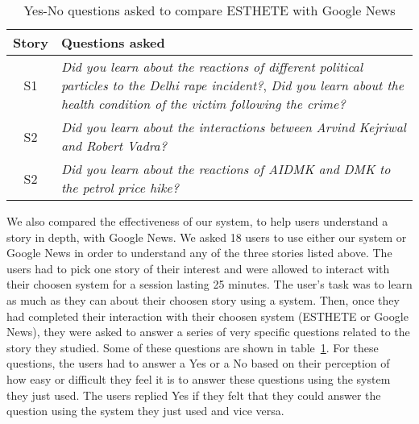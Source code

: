 \begin{table}
\small
\begin{tabular}{|c|p{7cm}|}
\hline
{\bf Story} & {\bf Questions asked}\\
\hline
S1 & {\em Did you learn about the reactions of different political particles to the Delhi rape incident?}, {\em Did you learn about the health condition of the victim following the crime?}\\
\hline
S2 & {\em Did you learn about the interactions between Arvind Kejriwal and Robert Vadra?}\\
\hline
S2 & {\em Did you learn about the reactions of AIDMK and DMK to the petrol price hike?}\\
\hline
\end{tabular}
\caption{Yes-No questions asked to compare ESTHETE with Google News}
\label{tab:domain-yes-no-questions}
\end{table}
We also compared the effectiveness of our system, to help users understand a story in depth, with Google News. We asked 18 users to use either our system or Google News in order to understand any of the three stories listed above. The users had to pick one story of their interest and were allowed to interact with their choosen system for a session lasting 25 minutes. The user's task was to learn as much as they can about their choosen story using a system. Then, once they had completed their
interaction with their choosen system (ESTHETE or Google News), they were asked to answer a series of very specific questions related to the story they studied. Some of these questions are shown in table~\ref{tab:domain-yes-no-questions}. For these questions, the users had to answer a Yes or a No based on their perception of how easy or difficult they feel it is to answer these questions using the system they just used. The users replied Yes if they felt that they could answer the question using the system they just used and vice versa.

